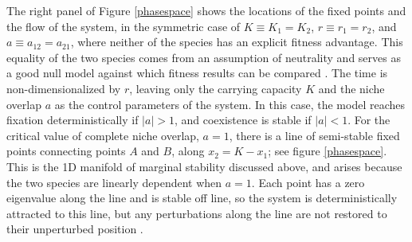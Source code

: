 \documentclass[a4paper,10pt]{article}
\numberwithin{equation}{section} %
\begin{document}
The right panel of Figure \ref{phasespace} shows the locations of the fixed points and the flow of the system, in the symmetric case of $K \equiv K_1 = K_2$, $r \equiv r_1 = r_2$, and $a\equiv a_{12}=a_{21}$, where neither of the species has an explicit fitness advantage. 
This equality of the two species comes from an assumption of neutrality and serves as a good null model against which fitness results can be compared \cite{I'm not sure this is necessary}. 
The time is non-dimensionalized by $r$, leaving only the carrying capacity $K$ and the niche overlap $a$ as the control parameters of the system. %
In this case, the model reaches fixation deterministically if $|a|>1$, and coexistence is stable if $|a|<1$. 
For the critical value of complete niche overlap, $a=1$, there is a line of semi-stable fixed points connecting points $A$ and $B$, along $x_2 = K - x_1$; see figure \ref{phasespace}. 
This is the 1D manifold of marginal stability discussed above, and arises because the two species are linearly dependent when $a=1$. 
Each point has a zero eigenvalue along the line and is stable off line, so the system is deterministically attracted to this line, but any perturbations along the line are not restored to their unperturbed position \cite{McGehee1977a,Case1979}. %
\end{document}
